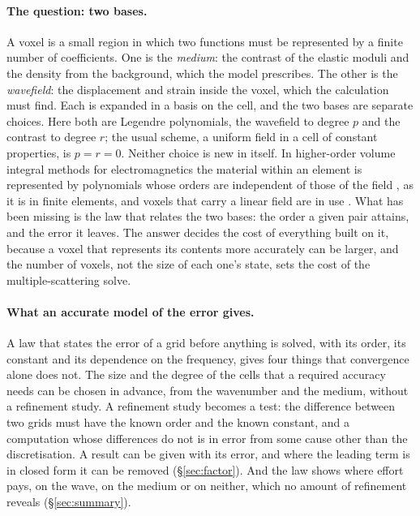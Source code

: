 \documentclass[11pt,a4paper]{article}
\begin{document}
\paragraph{The question: two bases.} A voxel is a small region in which two functions must be
represented by a finite number of coefficients. One is the \emph{medium}: the contrast of the elastic
moduli and the density from the background, which the model prescribes. The other is the
\emph{wavefield}: the displacement and strain inside the voxel, which the calculation must find. Each
is expanded in a basis on the cell, and the two bases are separate choices. Here both are Legendre
polynomials, the wavefield to degree $p$ and the contrast to degree $r$; the usual scheme, a uniform
field in a cell of constant properties, is $p=r=0$. Neither
choice is new in itself. In higher-order volume integral methods for electromagnetics the material
within an element is represented by polynomials whose orders are independent of those of the field
\citep{Chobanyan2015}, as it is in finite elements, and voxels that carry a linear field are in use
\citep{Georgakis2020}. What has been missing is the law that relates the two bases: the order a given
pair attains, and the error it leaves. The answer decides the cost of everything built on it,
because a voxel that represents its contents more accurately can be larger, and the number of voxels,
not the size of each one's state, sets the cost of the multiple-scattering solve.

\paragraph{What an accurate model of the error gives.} A law that states the error of a grid before
anything is solved, with its order, its constant and its dependence on the frequency, gives four things
that convergence alone does not. The size and the degree of the cells that a required accuracy needs can
be chosen in advance, from the wavenumber and the medium, without a refinement study. A refinement study
becomes a test: the difference between two grids must have the known order and the known constant, and a
computation whose differences do not is in error from some cause other than the discretisation. A result
can be given with its error, and where the leading term is in closed form it can be removed
(\S\ref{sec:factor}). And the law shows where effort pays, on the wave, on the medium or on neither,
which no amount of refinement reveals (\S\ref{sec:summary}).
\end{document}
